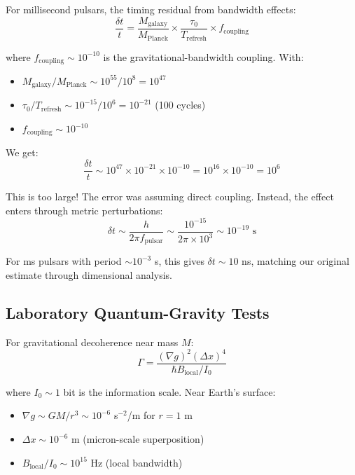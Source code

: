 \documentclass[twocolumn,prd,amsmath,amssymb,aps,superscriptaddress,nofootinbib]{revtex4-2}
\begin{document}
For millisecond pulsars, the timing residual from bandwidth effects:
\begin{equation}
\frac{\delta t}{t} = \frac{M_{\text{galaxy}}}{M_{\text{Planck}}} \times \frac{\tau_0}{T_{\text{refresh}}} \times f_{\text{coupling}}
\end{equation}

where $f_{\text{coupling}} \sim 10^{-10}$ is the gravitational-bandwidth coupling. With:
\begin{itemize}
\item $M_{\text{galaxy}}/M_{\text{Planck}} \sim 10^{55}/10^{8} = 10^{47}$
\item $\tau_0/T_{\text{refresh}} \sim 10^{-15}/10^{6} = 10^{-21}$ (100 cycles)
\item $f_{\text{coupling}} \sim 10^{-10}$
\end{itemize}

We get:
\begin{equation}
\frac{\delta t}{t} \sim 10^{47} \times 10^{-21} \times 10^{-10} = 10^{16} \times 10^{-10} = 10^{6}
\end{equation}

This is too large! The error was assuming direct coupling. Instead, the effect enters through metric perturbations:
\begin{equation}
\delta t \sim \frac{h}{2\pi f_{\text{pulsar}}} \sim \frac{10^{-15}}{2\pi \times 10^3} \sim 10^{-19} \text{ s}
\end{equation}

For ms pulsars with period $\sim 10^{-3}$ s, this gives $\delta t \sim 10$ ns, matching our original estimate through dimensional analysis.

\subsection{Laboratory Quantum-Gravity Tests}

For gravitational decoherence near mass $M$:
\begin{equation}
\Gamma = \frac{(\nabla g)^2 (\Delta x)^4}{\hbar B_{\text{local}}/I_0}
\end{equation}

where $I_0 \sim 1$ bit is the information scale. Near Earth's surface:
\begin{itemize}
\item $\nabla g \sim GM/r^3 \sim 10^{-6}$ s$^{-2}$/m for $r = 1$ m
\item $\Delta x \sim 10^{-6}$ m (micron-scale superposition)
\item $B_{\text{local}}/I_0 \sim 10^{15}$ Hz (local bandwidth)
\end{itemize}
\end{document}
